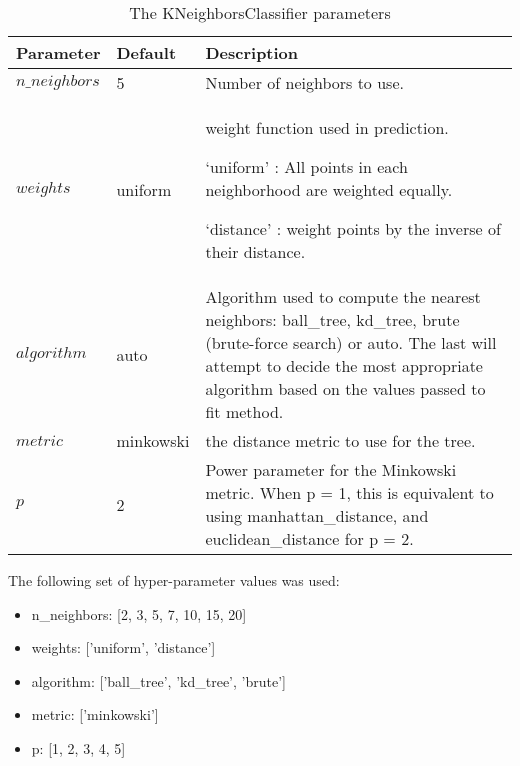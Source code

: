 \begin{table}[h!]
	\caption{The KNeighborsClassifier parameters}
	\begin{tabular}{ | l | l | p{7cm} |}
		\hline
		\textbf{Parameter} & \textbf{Default} & \textbf{Description}\\
		\hline
		$n\_neighbors$ & 5 & Number of neighbors to use.\\
		\hline
		$weights$ & uniform & weight function used in prediction.
		
		‘uniform’ : All points in each neighborhood are weighted equally. 
		
		‘distance’ : weight points by the inverse of their distance.\\
		\hline
		$algorithm$ & auto & Algorithm used to compute the nearest neighbors: ball\_tree, kd\_tree, brute (brute-force search) or auto. The last will attempt to decide the most appropriate algorithm based on the values passed to fit method.\\
		\hline
		$metric$ & minkowski & the distance metric to use for the tree.\\
		\hline
		$p$ & 2 & Power parameter for the Minkowski metric. When p = 1, this is equivalent to using manhattan\_distance, and euclidean\_distance for p = 2.\\
		\hline
	\end{tabular}
	\label{table:KNNdefaults}
\end{table}
The following set of hyper-parameter values was used:
\begin{itemize}
	\item n\_neighbors: [2, 3, 5, 7, 10, 15, 20]
	\item weights: ['uniform', 'distance']
	\item algorithm: ['ball\_tree', 'kd\_tree', 'brute']
	\item metric: ['minkowski']
	\item p: [1, 2, 3, 4, 5]
\end{itemize}

